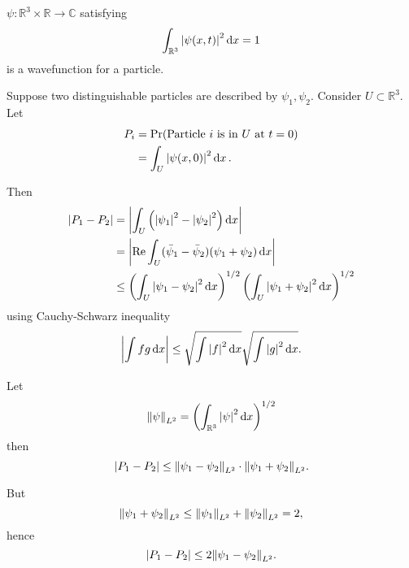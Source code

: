\documentclass[a4paper,11pt]{article}
\begin{document}
	\begin{ex}
		$\psi : \mathbb{R}^3 \times \mathbb{R} \to \mathbb{C}$ satisfying 
		\[
			\int _{\mathbb{R}^3} \abs{\psi(x, t)}^2 \dd{x} = 1
		\]
		is a wavefunction for a particle.

		Suppose two distinguishable particles are described by $\psi_1, \psi_2$. Consider $U \subset \mathbb{R}^3$. Let 
		\begin{align*}
			P_i & = \Pr(\text{Particle $i$ is in $U$ at $t= 0$})\\
			& = \int _{U} \abs{\psi(x, 0)}^2 \dd{x}.
		\end{align*}

		Then
		\begin{align*}
			\abs{P_1 - P_2} & = \abs{\int _{U} \left( \abs{\psi_1}^2 - \abs{\psi_2}^2 \right) \dd{x}} \\
			& = \abs{\Re \int _U (\bar \psi_1 - \bar \psi_2) (\psi_1 + \psi_2) \dd{x}}\\
			& \leq \left( \int_U \abs{\psi_1 - \psi_2}^2 \dd{x} \right)^{1/2} \left( \int_U \abs{\psi_1 + \psi_2}^2 \dd{x} \right)^{1/2}
		\end{align*}
		using Cauchy-Schwarz inequality
		\[
			\abs{\int fg \dd{x}} \leq \sqrt{\int \abs{f}^2 \dd{x}} \sqrt{\int \abs{g}^2 \dd{x}}.
		\]
		
		Let 
		\[
			\norm{\psi}_{L^2} = \left( \int_{\mathbb{R}^3} \abs{\psi}^2 \dd{x} \right)^{1/2}
		\]
		then
		\[
			\abs{P_1 - P_2} \leq \norm{\psi_1 - \psi_2}_{L^2} \cdot \norm{\psi_1 + \psi_2}_{L^2}.
		\]
		
		But 
		\[
			\norm{\psi_1 + \psi_2}_{L^2} \leq \norm{\psi_1}_{L^2} + \norm{\psi_2}_{L^2} = 2,
		\]
		hence
		\[
			\abs{P_1 - P_2} \leq 2 \norm{\psi_1 - \psi_2}_{L^2}.
		\]
		
	\end{ex}
\end{document}

